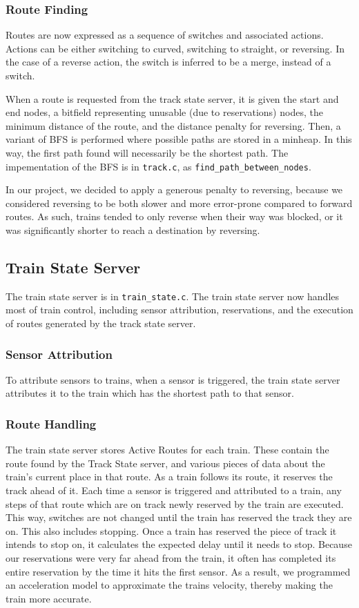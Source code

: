 \documentclass{article}
\begin{document}
\subsubsection{ Route Finding }
Routes are now expressed as a sequence of switches and associated actions. Actions can be either switching to curved, switching to straight, or reversing. In the case of a reverse action, the switch is inferred to be a merge, instead of a switch.

When a route is requested from the track state server, it is given the start and end nodes, a bitfield representing unusable (due to reservations) nodes, the minimum distance of the route, and the distance penalty for reversing. Then, a variant of BFS is performed where possible paths are stored in a minheap. In this way, the first path found will necessarily be the shortest path. 
The impementation of the BFS is in \verb|track.c|, as \verb|find_path_between_nodes|.

In our project, we decided to apply a generous penalty to reversing, because we considered reversing to be both slower and more error-prone compared to forward routes. As such, trains tended to only reverse when their way was blocked, or it was significantly shorter to reach a destination by reversing.

\subsection{ Train State Server}
The train state server is in \verb|train_state.c|.
The train state server now handles most of train control, including sensor attribution, reservations, and the execution of routes generated by the track state server.
\subsubsection{ Sensor Attribution}
To attribute sensors to trains, when a sensor is triggered, the train state server attributes it to the train which has the shortest path to that sensor.

\subsubsection{Route Handling}
The train state server stores Active Routes for each train. These contain the route found by the Track State server, and various pieces of data about the train's current place in that route.
As a train follows its route, it reserves the track ahead of it.
Each time a sensor is triggered and attributed to a train, any steps of that route which are on track newly reserved by the train are executed. This way, switches are not changed until the train has reserved the track they are on. 
This also includes stopping. Once a train has reserved the piece of track it intends to stop on, it calculates the expected delay until it needs to stop.
Because our reservations were very far ahead from the train, it often has completed its entire reservation by the time it hits the first sensor. As a result, we programmed an acceleration model to approximate the trains velocity, thereby making the train more accurate.
\end{document}
